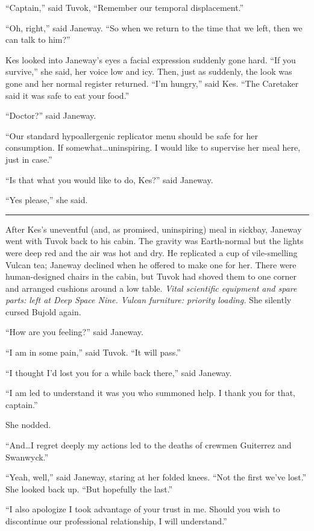 \documentclass[twoside,letterpaper,12pt]{memoir}
\begin{document}
``Captain,'' said Tuvok, ``Remember our temporal displacement.'' 

``Oh, right,'' said Janeway. ``So when we return to the time that we left, then we can talk to him?'' 

Kes looked into Janeway’s eyes a facial expression suddenly gone hard. ``If you survive,'' she said, her voice low and icy. Then, just as suddenly, the look was gone and her normal register returned. ``I'm hungry,'' said Kes. ``The Caretaker said it was safe to eat your food.'' 

``Doctor?'' said Janeway. 

``Our standard hypoallergenic replicator menu should be safe for her consumption. If somewhat\ldots uninspiring. I would like to supervise her meal here, just in case.'' 

``Is that what you would like to do, Kes?'' said Janeway. 

``Yes please,'' she said. 

\fancybreak{\rule{3cm}{0.4 pt}} 

After Kes's uneventful (and, as promised, uninspiring) meal in sickbay, Janeway went with Tuvok back to his cabin. The gravity was Earth-normal but the lights were deep red and the air was hot and dry. He replicated a cup of vile-smelling Vulcan tea; Janeway declined when he offered to make one for her. There were human-designed chairs in the cabin, but Tuvok had shoved them to one corner and arranged cushions around a low table. \textit{Vital scientific equipment and spare parts: left at Deep Space Nine. Vulcan furniture: priority loading. }She silently cursed Bujold again. 

``How are you feeling?'' said Janeway. 

``I am in some pain,'' said Tuvok. ``It will pass.'' 

``I thought I'd lost you for a while back there,'' said Janeway. 

``I am led to understand it was you who summoned help. I thank you for that, captain.'' 

She nodded. 

``And\ldots I regret deeply my actions led to the deaths of crewmen Guiterrez and Swanwyck.'' 

``Yeah, well,'' said Janeway, staring at her folded knees. ``Not the first we've lost.'' She looked back up. ``But hopefully the last.'' 

``I also apologize I took advantage of your trust in me. Should you wish to discontinue our professional relationship, I will understand.'' 
\end{document}
